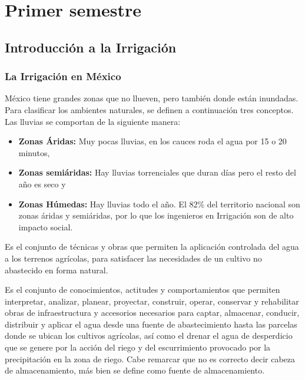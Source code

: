 \part{Primer semestre}
\chapter{Introducción a la Irrigación}
\section{La Irrigación en México}
México tiene grandes zonas que no llueven, pero también donde están inundadas. Para clasificar los ambientes naturales, se definen a continuación tres conceptos. Las lluvias se comportan de la siguiente manera: 
\begin{itemize}
	\item \textbf{Zonas Áridas:} Muy pocas lluvias, en los cauces roda el agua por 15 o 20 minutos,
	\item \textbf{Zonas semiáridas:} Hay lluvias torrenciales que duran días pero el resto del año es seco y
	\item \textbf{Zonas Húmedas:} Hay lluvias todo el año. El 82\% del territorio nacional son zonas áridas y semiáridas, por lo que los ingenieros en Irrigación son de alto impacto social.
\end{itemize}
\begin{definition}
	Es el conjunto de técnicas y obras que permiten la aplicación controlada del agua a los terrenos agrícolas, para satisfacer las necesidades de un cultivo no abastecido en forma natural\autocite{Eduardo2018}.
\end{definition}
\begin{definition}
	Es el conjunto de conocimientos, actitudes y comportamientos que permiten interpretar, analizar, planear, proyectar, construir, operar, conservar y rehabilitar obras de infraestructura y accesorios necesarios para captar, almacenar, conducir, distribuir y aplicar el agua desde una fuente de abastecimiento hasta las parcelas donde se ubican los cultivos agrícolas, así como el drenar el agua de desperdicio que se genere por la acción del riego y del escurrimiento provocado por la precipitación en la zona de riego. Cabe remarcar que no es correcto decir cabeza de almacenamiento, más bien se define como fuente de almacenamiento.
\end{definition}
